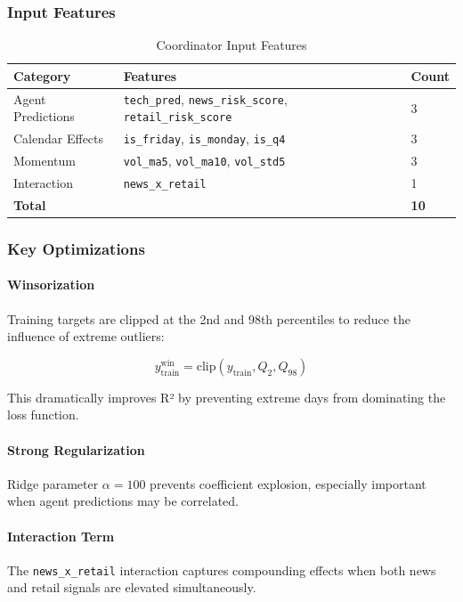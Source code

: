 \documentclass[12pt,a4paper]{article}
\begin{document}
\subsubsection{Input Features}

\begin{table}[H]
\centering
\begin{tabular}{lll}
\toprule
\textbf{Category} & \textbf{Features} & \textbf{Count} \\
\midrule
Agent Predictions & \texttt{tech\_pred}, \texttt{news\_risk\_score}, \texttt{retail\_risk\_score} & 3 \\
Calendar Effects & \texttt{is\_friday}, \texttt{is\_monday}, \texttt{is\_q4} & 3 \\
Momentum & \texttt{vol\_ma5}, \texttt{vol\_ma10}, \texttt{vol\_std5} & 3 \\
Interaction & \texttt{news\_x\_retail} & 1 \\
\midrule
\textbf{Total} & & \textbf{10} \\
\bottomrule
\end{tabular}
\caption{Coordinator Input Features}
\label{tab:coord_features}
\end{table}

\subsubsection{Key Optimizations}

\paragraph{Winsorization}
Training targets are clipped at the 2nd and 98th percentiles to reduce the influence of extreme outliers:

\begin{equation}
    y_{\text{train}}^{\text{win}} = \text{clip}(y_{\text{train}}, Q_2, Q_{98})
\end{equation}

This dramatically improves R² by preventing extreme days from dominating the loss function.

\paragraph{Strong Regularization}
Ridge parameter $\alpha = 100$ prevents coefficient explosion, especially important when agent predictions may be correlated.

\paragraph{Interaction Term}
The \texttt{news\_x\_retail} interaction captures compounding effects when both news and retail signals are elevated simultaneously.
\end{document}
